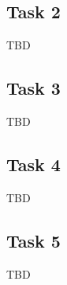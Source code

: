 \documentclass[a4paper,12pt]{article}
\begin{document}
\subsection*{Task 2}

TBD


\subsection*{Task 3}

TBD


\subsection*{Task 4}

TBD


\subsection*{Task 5}

TBD
\end{document}
